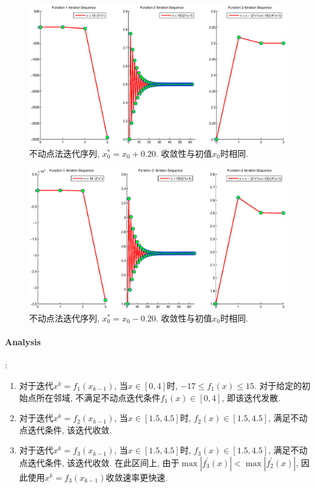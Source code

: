 \documentclass{article}
\begin{document}
\begin{CJK*}{UTF8}{song}
				\begin{figure}[H]
					\centering
					\includegraphics[width=1.0\textwidth]{../chapter2_1_0_5.eps}
					\caption{不动点法迭代序列, $x_0^{*} = x_0 + 0.20$. 收敛性与初值$x_0$时相同.}
					\label{img_chapter2_1_0_5}
				\end{figure}
				
				\begin{figure}[H]
					\centering
					\includegraphics[width=1.0\textwidth]{../chapter2_1_0_6.eps}
					\caption{不动点法迭代序列, $x_0^{*} = x_0 - 0.20$. 收敛性与初值$x_0$时相同.}
					\label{img_chapter2_1_0_6}
				\end{figure}
			
			\paragraph{Analysis}:\newline
				\begin{enumerate}
					\item 对于迭代$x^k=f_1\left(x_{k-1}\right)$, 当$x \in \left[0,4\right]$时, $-17 \leq f_1\left(x\right) \leq 15 $. 对于给定的初始点所在邻域, 不满足不动点迭代条件$f_1\left(x\right) \in \left[0,4\right]$, 即该迭代发散.
					\item 对于迭代$x^k=f_2\left(x_{k-1}\right)$, 当$x \in \left[1.5,4.5\right]$时, $f_2\left(x\right) \in \left[1.5,4.5\right]$, 满足不动点迭代条件, 该迭代收敛.
					\item 对于迭代$x^k=f_3\left(x_{k-1}\right)$, 当$x \in \left[1.5,4.5\right]$时, $f_3\left(x\right) \in \left[1.5,4.5\right]$, 满足不动点迭代条件, 该迭代收敛. 在此区间上, 由于$\max \left|f_3^{'} \left(x \right)   \right| <\max 
					\left|f_2^{'}\left(x\right) \right|$, 因此使用$x^k=f_3\left(x_{k-1}\right)$收敛速率更快速.
				\end{enumerate}

\end{CJK*}
\end{document}

